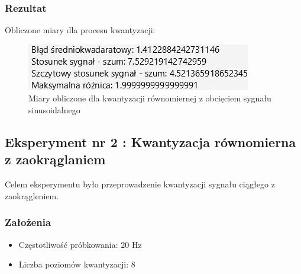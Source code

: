 \documentclass[12pt]{article}
\begin{document}
\subsubsection{Rezultat}
Obliczone miary dla procesu kwantyzacji:
\begin{figure}[H]
    \centering
	\includegraphics[width=\linewidth]{wyniki_kwantyzacja_z_obcieciem.jpg}
    \caption{Miary obliczone dla kwantyzacji równomiernej z obcięciem sygnału sinusoidalnego}
    \label{Wartości dla eksperymentu 1}
\end{figure}




\newpage
\subsection{Eksperyment nr 2 : Kwantyzacja równomierna z zaokrąglaniem}

Celem eksperymentu było przeprowadzenie kwantyzacji sygnału ciągłego z zaokrągleniem.

\subsubsection{Założenia}

\begin{itemize}
	\item Częstotliwość próbkowania: 20 Hz
	\item Liczba poziomów kwantyzacji: 8
\end{itemize}
\end{document}
